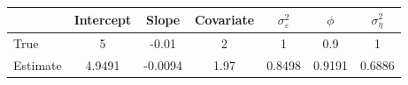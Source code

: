 \begin{tabular}{lcccccc}
\toprule
& Intercept & Slope & Covariate & $\sigma_\varepsilon^2$ & $\phi$ & $\sigma_\eta^2$ \\
\midrule
True & 5 & -0.01 & 2 & 1 & 0.9 & 1 \\
Estimate & 4.9491 & -0.0094 & 1.97 & 0.8498 & 0.9191 & 0.6886 \\
\bottomrule
\end{tabular}
